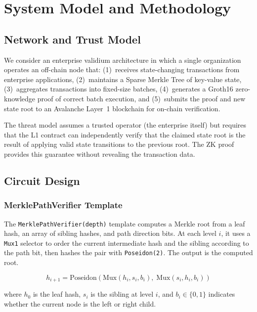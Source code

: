 \section{System Model and Methodology}

\subsection{Network and Trust Model}

We consider an enterprise validium architecture in which a single
organization operates an off-chain node that: (1)~receives state-changing
transactions from enterprise applications, (2)~maintains a Sparse Merkle
Tree of key-value state, (3)~aggregates transactions into fixed-size
batches, (4)~generates a Groth16 zero-knowledge proof of correct batch
execution, and (5)~submits the proof and new state root to an
Avalanche Layer~1 blockchain for on-chain verification.

The threat model assumes a trusted operator (the enterprise itself) but
requires that the L1 contract can independently verify that the claimed
state root is the result of applying valid state transitions to the
previous root. The ZK proof provides this guarantee without revealing
the transaction data.

\subsection{Circuit Design}

\subsubsection{MerklePathVerifier Template}

The \texttt{MerklePathVerifier(depth)} template computes a Merkle root
from a leaf hash, an array of sibling hashes, and path direction bits.
At each level $i$, it uses a \texttt{Mux1} selector to order the current
intermediate hash and the sibling according to the path bit, then hashes
the pair with \texttt{Poseidon(2)}. The output is the computed root.

\begin{equation}
h_{i+1} = \text{Poseidon}\!\left(
  \text{Mux}(h_i, s_i, b_i),\;
  \text{Mux}(s_i, h_i, b_i)
\right)
\label{eq:merkle-level}
\end{equation}

where $h_0$ is the leaf hash, $s_i$ is the sibling at level $i$, and
$b_i \in \{0,1\}$ indicates whether the current node is the left or
right child.

